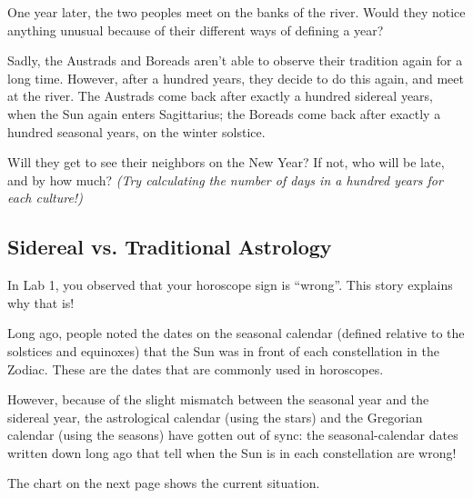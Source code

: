 \documentclass[11pt]{article}
\begin{document}
One year later, the two peoples meet on the banks of the river. Would they notice anything unusual because of their different ways of defining a year?


\newpage
Sadly, the Austrads and Boreads aren't able to observe their tradition again for a long time. However, after a hundred years, they decide to do this again, and meet at the river. The Austrads come back after exactly a hundred sidereal years, when the Sun again enters Sagittarius; the Boreads come back after exactly a hundred seasonal years, on the winter solstice.

Will they get to see their neighbors on the New Year? If not, who will be late, and by how much? {\it (Try calculating the number of days in a hundred years for each culture!)}

\vspace{3in}
\underline{\hspace{6in}}

\subsection{Sidereal vs. Traditional Astrology}

In Lab 1, you observed that your horoscope sign is ``wrong''. This story explains why that is! 

Long ago, people noted the dates on the seasonal calendar (defined relative to the solstices and equinoxes) that the Sun was in front of each constellation in the Zodiac. These are the dates that are commonly used in horoscopes.

However, because of the slight mismatch between the seasonal year and the sidereal year, the astrological calendar (using the stars) and the Gregorian calendar (using the seasons) have gotten out of sync: the seasonal-calendar dates written down long ago that tell when the Sun is in each constellation are wrong! 

The chart on the next page shows the current situation.
\end{document}

